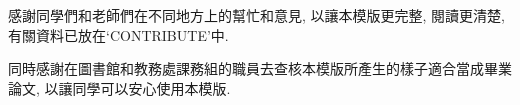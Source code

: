 \StartAcknowledgmentsChi

感謝同學們和老師們在不同地方上的幫忙和意見, 以讓本模版更完整, 閱讀更清楚, 有關資料已放在`CONTRIBUTE'中.

同時感謝在圖書館和教務處課務組的職員去查核本模版所產生的樣子適合當成畢業論文, 以讓同學可以安心使用本模版.

\EndAcknowledgments
